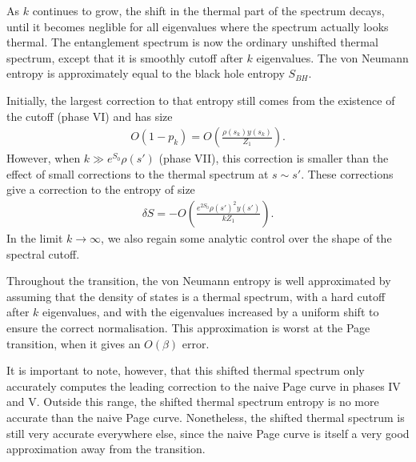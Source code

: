 \documentclass[12pt]{article}
\newcommand{\smax}{s_k}
\newcommand{\sprime}{s'}
\numberwithin{equation}{section}
\begin{document}
As $k$ continues to grow, the shift in the thermal part of the spectrum decays, until it becomes neglible for all eigenvalues where the spectrum actually looks thermal. The entanglement spectrum is now the ordinary unshifted thermal spectrum, except that it is smoothly cutoff after $k$ eigenvalues. The von Neumann entropy is approximately equal to the black hole entropy $S_{BH}$.

Initially, the largest correction to that entropy still comes from the existence of the cutoff (phase VI) and has size 
\begin{align}
O(1- p_k) = O\left(\frac{\rho(\smax) y(\smax)}{Z_1}\right). 
\end{align}
However, when $k \gg e^{S_0} \rho(\sprime)$ (phase VII), this correction is smaller than the effect of small corrections to the thermal spectrum at $s \sim \sprime$. These corrections give a correction to the entropy of size 
\begin{align}
\delta S = - O\left(\frac{e^{2S_0} \rho(\sprime)^2 y(\sprime)}{k Z_1}\right).
\end{align}
 In the limit $k \to \infty$, we also regain some analytic control over the shape of the spectral cutoff.

Throughout the transition, the von Neumann entropy is well approximated by assuming that the density of states is a thermal spectrum, with a hard cutoff after $k$ eigenvalues, and with the eigenvalues increased by a uniform shift to ensure the correct normalisation. This approximation is worst at the Page transition, when it gives an $O(\beta)$ error. 

It is important to note, however, that this shifted thermal spectrum only accurately computes the leading correction to the naive Page curve in phases IV and V. Outside this range, the shifted thermal spectrum entropy is no more accurate than the naive Page curve. Nonetheless,  the shifted thermal spectrum is still very accurate everywhere else, since the naive Page curve is itself a very good approximation away from the transition.
\end{document}
